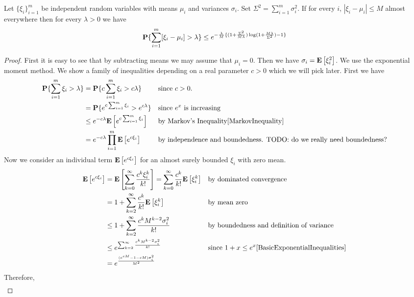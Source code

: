 \begin{lem}\label{Bennett} Let $\{\xi_i\}_{i=1}^m$ be independent random variables with means $\mu_i$ and variances $\sigma_i$.  Set $\Sigma^2 = \sum_{i=1}^m \sigma_i^2$.  If for every $i$, $|\xi_i - \mu_i| \leq M$ almost everywhere then for every $\lambda > 0$ we have $$
\textbf{P}\{\sum_{i=1}^m [\xi_i - \mu_i] > \lambda\} \leq 
e^{
	-\frac{\lambda}{M}\{(1 + \frac{\Sigma^2}{M\lambda})\log(1+\frac{M\lambda}{\Sigma^2}) - 1\}
}
$$
\end{lem}
\begin{proof}
First it is easy to see that by subtracting means we may assume that
$\mu_i=0$.  Then we have $\sigma_i = \textbf{E}\left[\xi_i^2\right]$.  We use
the exponential moment method.  We show a family of inequalities
depending on a real parameter $c > 0$ which we will pick later.  First we have 
\begin{align*}
\textbf{P}\{\sum_{i=1}^m \xi_i > \lambda\} & =
\textbf{P}\{c\sum_{i=1}^m \xi_i > c\lambda\}  && \textrm{since } c >0.\\
  & =\textbf{P}\{e^{c\sum_{i=1}^m \xi_i} > e^{c\lambda}\} &&
  \textrm{since } e^x \textrm{ is increasing}\\
  & \leq e^{-c\lambda} \textbf{E}\left[e^{c\sum_{i=1}^m \xi_i}\right] && \textrm
  {by Markov's Inequality}\eqref{MarkovInequality}\\
  & = e^{-c\lambda} \prod_{i=1}^m \textbf{E}\left[e^{c\xi_i}\right] &&
  \textrm{by independence and boundedness.  TODO: do we really need boundedness?}
\end{align*}
Now we consider an individual term $\textbf{E}\left[e^{c\xi_i}\right]$ for an
almost surely bounded $\xi_i$ with zero mean.
\begin{align*}
\textbf{E}\left[e^{c\xi_i}\right] &= \textbf{E}\left[\sum_{k=0}^\infty
  \frac{c^k\xi_i^k}{k!}\right] = \sum_{k=0}^\infty
  \frac{c^k}{k!}\textbf{E}\left[\xi_i^k\right] && \textrm{by dominated
    convergence} \\
& = 1  + \sum_{k=2}^\infty
  \frac{c^k}{k!}\textbf{E}\left[\xi_i^k\right] && \textrm{by mean zero} \\
& \leq 1  + \sum_{k=2}^\infty
  \frac{c^k M^{k-2} \sigma_i^2}{k!} && \textrm{by boundedness and
    definition of variance} \\
& \leq e^{\sum_{k=2}^\infty  \frac{c^k M^{k-2} \sigma_i^2}{k!}} &&
\textrm{since } 1+x \leq e^x \eqref{BasicExponentialInequalities} \\
& = e^{\frac{(e^{cM} -1 - cM)\sigma_i^2}{M^2}}
\end{align*}
Therefore,
\begin{align*}

\end{align*}
\end{proof}
